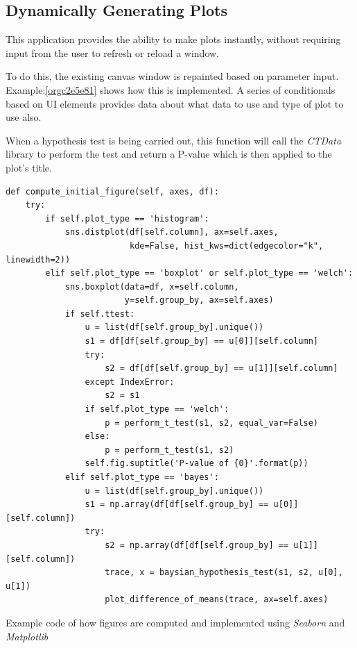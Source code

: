\documentclass[11pt]{report}
\begin{document}
\subsection{Dynamically Generating Plots}
\label{sec:orge68f82a}
This application provides the ability to make plots instantly, without requiring input from the user to refresh or reload a window.

To do this, the existing canvas window is repainted based on parameter input. Example:\ref{orgc2e5e81}
shows how this is implemented. A series of conditionals based on UI elements provides data about what data to use and type of plot to use also.

When a hypothesis test is being carried out, this function will call the \emph{CTData} library to perform the test and return a P-value which is then applied to the plot's title.

\begin{listing}[htbp]
\begin{verbatim}
def compute_initial_figure(self, axes, df):
    try:
        if self.plot_type == 'histogram':
            sns.distplot(df[self.column], ax=self.axes,
                         kde=False, hist_kws=dict(edgecolor="k", linewidth=2))
        elif self.plot_type == 'boxplot' or self.plot_type == 'welch':
            sns.boxplot(data=df, x=self.column,
                        y=self.group_by, ax=self.axes)
            if self.ttest:
                u = list(df[self.group_by].unique())
                s1 = df[df[self.group_by] == u[0]][self.column]
                try:
                    s2 = df[df[self.group_by] == u[1]][self.column]
                except IndexError:
                    s2 = s1
                if self.plot_type == 'welch':
                    p = perform_t_test(s1, s2, equal_var=False)
                else:
                    p = perform_t_test(s1, s2)
                self.fig.suptitle('P-value of {0}'.format(p))
            elif self.plot_type == 'bayes':
                u = list(df[self.group_by].unique())
                s1 = np.array(df[df[self.group_by] == u[0]][self.column])
                try:
                    s2 = np.array(df[df[self.group_by] == u[1]][self.column])
                    trace, x = baysian_hypothesis_test(s1, s2, u[0], u[1])
                    plot_difference_of_means(trace, ax=self.axes)
\end{verbatim}
\caption{\label{orgc2e5e81}
Example code of how figures are computed and implemented using \emph{Seaborn} and \emph{Matplotlib}}
\end{listing}
\end{document}
